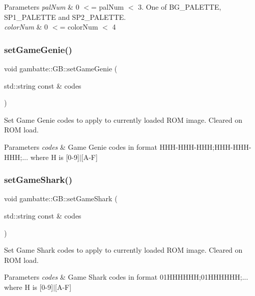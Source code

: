 \begin{DoxyParams}{Parameters}
{\em pal\+Num} & 0 $<$= pal\+Num $<$ 3. One of B\+G\+\_\+\+P\+A\+L\+E\+T\+TE, S\+P1\+\_\+\+P\+A\+L\+E\+T\+TE and S\+P2\+\_\+\+P\+A\+L\+E\+T\+TE. \\
\hline
{\em color\+Num} & 0 $<$= color\+Num $<$ 4 \\
\hline
\end{DoxyParams}
\mbox{\label{classgambatte_1_1GB_ab39e81dad0d44900154c8c555b39d35c}} 
\subsubsection{\texorpdfstring{set\+Game\+Genie()}{setGameGenie()}}
{\footnotesize\ttfamily void gambatte\+::\+G\+B\+::set\+Game\+Genie (\begin{DoxyParamCaption}\item[{std\+::string const \&}]{codes }\end{DoxyParamCaption})}

Set Game Genie codes to apply to currently loaded R\+OM image. Cleared on R\+OM load. 
\begin{DoxyParams}{Parameters}
{\em codes} & Game Genie codes in format H\+H\+H-\/\+H\+H\+H-\/\+H\+HH;H\+H\+H-\/\+H\+H\+H-\/\+H\+HH;... where H is \mbox{[}0-\/9\mbox{]}$\vert$\mbox{[}A-\/F\mbox{]} \\
\hline
\end{DoxyParams}
\mbox{\label{classgambatte_1_1GB_a056a4e6a182ef54c54afff0516b3721c}} 
\subsubsection{\texorpdfstring{set\+Game\+Shark()}{setGameShark()}}
{\footnotesize\ttfamily void gambatte\+::\+G\+B\+::set\+Game\+Shark (\begin{DoxyParamCaption}\item[{std\+::string const \&}]{codes }\end{DoxyParamCaption})}

Set Game Shark codes to apply to currently loaded R\+OM image. Cleared on R\+OM load. 
\begin{DoxyParams}{Parameters}
{\em codes} & Game Shark codes in format 01\+H\+H\+H\+H\+HH;01\+H\+H\+H\+H\+HH;... where H is \mbox{[}0-\/9\mbox{]}$\vert$\mbox{[}A-\/F\mbox{]} \\
\hline
\end{DoxyParams}
\mbox{\label{classgambatte_1_1GB_a7b722194c9472371c28285cdbf35e70f}} 
